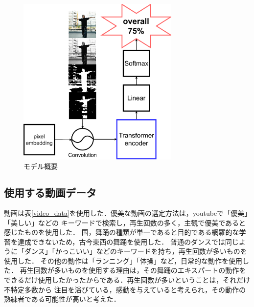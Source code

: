 \begin{figure}[t]
  \begin{center}
    \includegraphics[width=80mm]{images/chart/easy_chart.pdf}
  \end{center}
  \caption{モデル概要}
  \label{easy_chart}
\end{figure}

\subsection{使用する動画データ}
動画は表\ref{video_data}を使用した．優美な動画の選定方法は，youtubeで「優美」「美しい」などの
キーワードで検索し，再生回数の多く，主観で優美であると感じたものを使用した．
国，舞踊の種類が単一であると目的である網羅的な学習を達成できないため，古今東西の舞踊を使用した．
普通のダンスでは同じように「ダンス」「かっこいい」などのキーワードを持ち，再生回数が多いものを使用した．
その他の動作は「ランニング」「体操」など，日常的な動作を使用した．
再生回数が多いものを使用する理由は，その舞踊のエキスパートの動作を
できるだけ使用したかったからである．再生回数が多いということは，それだけ不特定多数から
注目を浴びている，感動を与えていると考えられ，その動作の熟練者である可能性が高いと考えた．
\clearpage

